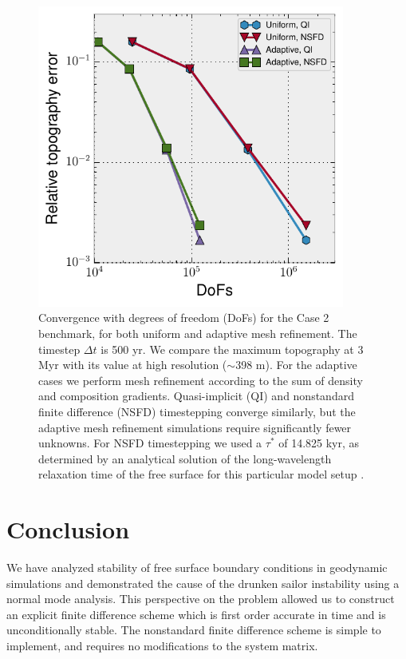\documentclass[preprint,12pt,authoryear]{elsarticle}
\begin{document}
\begin{figure}
\includegraphics[width=0.9\textwidth]{figures/amr.pdf}
\caption{Convergence with degrees of freedom (DoFs) for the \citet{crameri2012comparison} Case 2 benchmark, for both uniform and adaptive mesh refinement. The timestep $\Delta t$ is 500 yr. We compare the maximum topography at 3 Myr with its value at high resolution ($\sim$398 m). For the adaptive cases we perform mesh refinement according to the sum of density and composition gradients. Quasi-implicit (QI) and nonstandard finite difference (NSFD) timestepping converge similarly, but the adaptive mesh refinement simulations require significantly fewer unknowns. For NSFD timestepping we used a $\tau^*$ of 14.825 kyr, as determined by an analytical solution of the long-wavelength relaxation time of the free surface for this particular model setup \citep{crameri2012comparison}.}
\label{fig:amr}
\end{figure}

\section{Conclusion}
We have analyzed stability of free surface boundary conditions in geodynamic simulations and 
demonstrated the cause of the drunken sailor instability using a normal mode analysis.
This perspective on the problem allowed us to construct an explicit finite difference 
scheme which is first order accurate in time and is unconditionally stable.
The nonstandard finite difference scheme is simple to implement, and 
requires no modifications to the system matrix.
\end{document}
